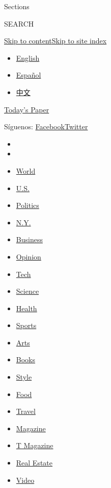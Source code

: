 Sections

SEARCH

\protect\hyperlink{site-content}{Skip to
content}\protect\hyperlink{site-index}{Skip to site index}

\begin{itemize}
\tightlist
\item
  \href{/}{English}
\item
  \href{https://www.nytimes.com/es/}{Español}
\item
  \href{https://cn.nytimes.com}{中文}
\end{itemize}

\href{https://myaccount.nytimes.com/auth/login?response_type=cookie\&client_id=vi}{}

\href{https://www.nytimes.com/section/todayspaper}{Today's Paper}

Síguenos:
\href{https://www.facebook.com/nytimeses/}{Facebook}\href{https://twitter.com/nytimesES}{Twitter}

\begin{itemize}
\item
\item
\item
  \href{https://www.nytimes.com/section/world}{World}
\item
  \href{https://www.nytimes.com/section/us}{U.S.}
\item
  \href{https://www.nytimes.com/section/politics}{Politics}
\item
  \href{https://www.nytimes.com/section/nyregion}{N.Y.}
\item
  \href{https://www.nytimes.com/section/business}{Business}
\item
  \href{https://www.nytimes.com/section/opinion}{Opinion}
\item
  \href{https://www.nytimes.com/section/technology}{Tech}
\item
  \href{https://www.nytimes.com/section/science}{Science}
\item
  \href{https://www.nytimes.com/section/health}{Health}
\item
  \href{https://www.nytimes.com/section/sports}{Sports}
\item
  \href{https://www.nytimes.com/section/arts}{Arts}
\item
  \href{https://www.nytimes.com/section/books}{Books}
\item
  \href{https://www.nytimes.com/section/style}{Style}
\item
  \href{https://www.nytimes.com/section/food}{Food}
\item
  \href{https://www.nytimes.com/section/travel}{Travel}
\item
  \href{https://www.nytimes.com/section/magazine}{Magazine}
\item
  \href{https://www.nytimes.com/section/t-magazine}{T Magazine}
\item
  \href{https://www.nytimes.com/section/realestate}{Real Estate}
\item
  \href{https://www.nytimes.com/video}{Video}
\end{itemize}

